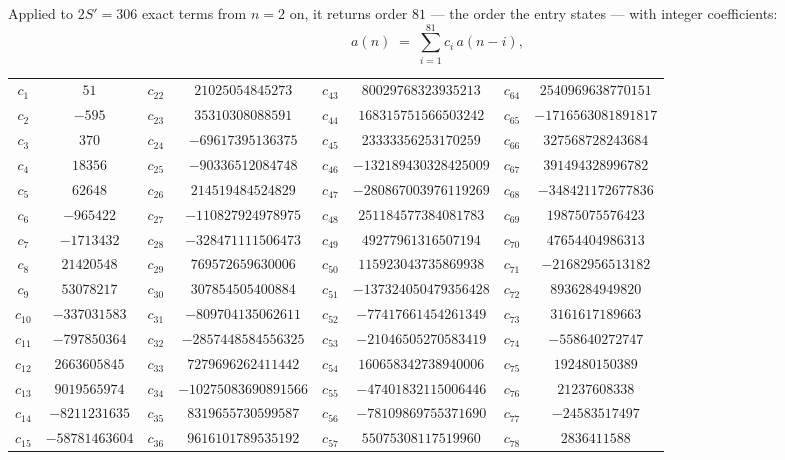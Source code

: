\documentclass[11pt,a4paper]{article}
\theoremstyle{plain}
\theoremstyle{definition}
\begin{document}
Applied to $2S'=306$ exact terms from $n=2$ on, it returns order $81$ --- the
order the entry states --- with integer coefficients:
\[
a(n)\;=\;\sum_{i=1}^{81}c_i\,a(n-i),
\]
\begin{center}\small
\begin{tabular}{cccccccc}
$c_{1}$ & $51$ & $c_{22}$ & $21025054845273$ & $c_{43}$ & $80029768323935213$ & $c_{64}$ & $2540969638770151$ \\
$c_{2}$ & $-595$ & $c_{23}$ & $35310308088591$ & $c_{44}$ & $168315751566503242$ & $c_{65}$ & $-1716563081891817$ \\
$c_{3}$ & $370$ & $c_{24}$ & $-69617395136375$ & $c_{45}$ & $23333356253170259$ & $c_{66}$ & $327568728243684$ \\
$c_{4}$ & $18356$ & $c_{25}$ & $-90336512084748$ & $c_{46}$ & $-132189430328425009$ & $c_{67}$ & $391494328996782$ \\
$c_{5}$ & $62648$ & $c_{26}$ & $214519484524829$ & $c_{47}$ & $-280867003976119269$ & $c_{68}$ & $-348421172677836$ \\
$c_{6}$ & $-965422$ & $c_{27}$ & $-110827924978975$ & $c_{48}$ & $251184577384081783$ & $c_{69}$ & $19875075576423$ \\
$c_{7}$ & $-1713432$ & $c_{28}$ & $-328471111506473$ & $c_{49}$ & $49277961316507194$ & $c_{70}$ & $47654404986313$ \\
$c_{8}$ & $21420548$ & $c_{29}$ & $769572659630006$ & $c_{50}$ & $115923043735869938$ & $c_{71}$ & $-21682956513182$ \\
$c_{9}$ & $53078217$ & $c_{30}$ & $307854505400884$ & $c_{51}$ & $-137324050479356428$ & $c_{72}$ & $8936284949820$ \\
$c_{10}$ & $-337031583$ & $c_{31}$ & $-809704135062611$ & $c_{52}$ & $-77417661454261349$ & $c_{73}$ & $3161617189663$ \\
$c_{11}$ & $-797850364$ & $c_{32}$ & $-2857448584556325$ & $c_{53}$ & $-21046505270583419$ & $c_{74}$ & $-558640272747$ \\
$c_{12}$ & $2663605845$ & $c_{33}$ & $7279696262411442$ & $c_{54}$ & $160658342738940006$ & $c_{75}$ & $192480150389$ \\
$c_{13}$ & $9019565974$ & $c_{34}$ & $-10275083690891566$ & $c_{55}$ & $-47401832115006446$ & $c_{76}$ & $21237608338$ \\
$c_{14}$ & $-8211231635$ & $c_{35}$ & $8319655730599587$ & $c_{56}$ & $-78109869755371690$ & $c_{77}$ & $-24583517497$ \\
$c_{15}$ & $-58781463604$ & $c_{36}$ & $9616101789535192$ & $c_{57}$ & $55075308117519960$ & $c_{78}$ & $2836411588$ \\

\end{tabular}
\end{center}
\end{document}
